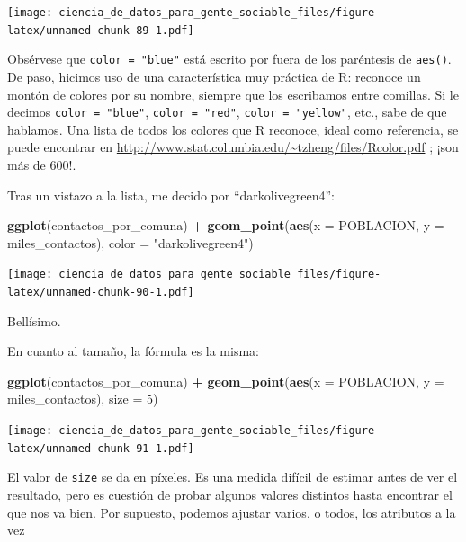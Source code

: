\documentclass[]{book}
\newenvironment{Shaded}{\begin{snugshade}}{\end{snugshade}}
\newcommand{\KeywordTok}[1]{\textcolor[rgb]{0.13,0.29,0.53}{\textbf{#1}}}
\newcommand{\DataTypeTok}[1]{\textcolor[rgb]{0.13,0.29,0.53}{#1}}
\newcommand{\DecValTok}[1]{\textcolor[rgb]{0.00,0.00,0.81}{#1}}
\newcommand{\StringTok}[1]{\textcolor[rgb]{0.31,0.60,0.02}{#1}}
\newcommand{\OperatorTok}[1]{\textcolor[rgb]{0.81,0.36,0.00}{\textbf{#1}}}
\newcommand{\NormalTok}[1]{#1}
\begin{document}
\texttt{[image: ciencia\_de\_datos\_para\_gente\_sociable\_files/figure-latex/unnamed-chunk-89-1.pdf]}

Obsérvese que \texttt{color\ =\ "blue"} está escrito por fuera de los
paréntesis de \texttt{aes()}. De paso, hicimos uso de una característica
muy práctica de R: reconoce un montón de colores por su nombre, siempre
que los escribamos entre comillas. Si le decimos
\texttt{color\ =\ "blue"}, \texttt{color\ =\ "red"},
\texttt{color\ =\ "yellow"}, etc., sabe de que hablamos. Una lista de
todos los colores que R reconoce, ideal como referencia, se puede
encontrar en \url{http://www.stat.columbia.edu/~tzheng/files/Rcolor.pdf}
; ¡son más de 600!.

Tras un vistazo a la lista, me decido por ``darkolivegreen4'':

\begin{Shaded}
\begin{Highlighting}[]
\KeywordTok{ggplot}\NormalTok{(contactos_por_comuna) }\OperatorTok{+}\StringTok{ }
\StringTok{    }\KeywordTok{geom_point}\NormalTok{(}\KeywordTok{aes}\NormalTok{(}\DataTypeTok{x =}\NormalTok{ POBLACION, }\DataTypeTok{y =}\NormalTok{ miles_contactos), }\DataTypeTok{color =} \StringTok{"darkolivegreen4"}\NormalTok{)}
\end{Highlighting}
\end{Shaded}

\texttt{[image: ciencia\_de\_datos\_para\_gente\_sociable\_files/figure-latex/unnamed-chunk-90-1.pdf]}

Bellísimo.

En cuanto al tamaño, la fórmula es la misma:

\begin{Shaded}
\begin{Highlighting}[]
\KeywordTok{ggplot}\NormalTok{(contactos_por_comuna) }\OperatorTok{+}\StringTok{ }
\StringTok{    }\KeywordTok{geom_point}\NormalTok{(}\KeywordTok{aes}\NormalTok{(}\DataTypeTok{x =}\NormalTok{ POBLACION, }\DataTypeTok{y =}\NormalTok{ miles_contactos), }\DataTypeTok{size =} \DecValTok{5}\NormalTok{)}
\end{Highlighting}
\end{Shaded}

\texttt{[image: ciencia\_de\_datos\_para\_gente\_sociable\_files/figure-latex/unnamed-chunk-91-1.pdf]}

El valor de \texttt{size} se da en píxeles. Es una medida difícil de
estimar antes de ver el resultado, pero es cuestión de probar algunos
valores distintos hasta encontrar el que nos va bien. Por supuesto,
podemos ajustar varios, o todos, los atributos a la vez
\end{document}
